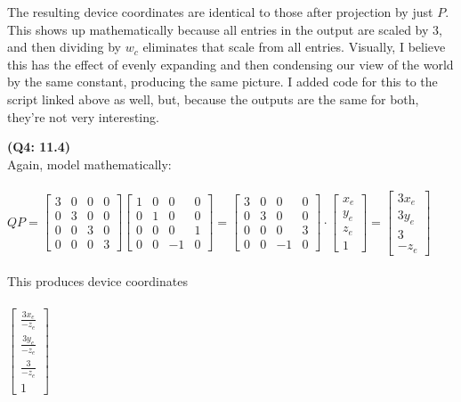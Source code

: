 \documentclass[letterpaper, 11pt]{article}
\begin{document}
The resulting device coordinates are identical to those after projection by just $P$. This shows up mathematically because all entries in the output are scaled by $3$, and then dividing by $w_c$ eliminates that scale from all entries. Visually, I believe this has the effect of evenly expanding and then condensing our view of the world by the same constant, producing the same picture. I added code for this to the script linked above as well, but, because the outputs are the same for both, they're not very interesting. 

\medskip
\textbf{(Q4: 11.4)} \\ 
Again, model mathematically: \\ \\ 
$QP = 
\begin{bmatrix}
3 & 0 & 0 & 0 \\
0 & 3 & 0 & 0 \\
0 & 0 & 3 & 0 \\
0 & 0 & 0 & 3
\end{bmatrix}
\begin{bmatrix}
1 & 0 & 0 & 0 \\
0 & 1 & 0 & 0 \\
0 & 0 & 0 & 1 \\
0 & 0 & -1 & 0
\end{bmatrix}
=
\begin{bmatrix}
3 & 0 & 0 & 0 \\
0 & 3 & 0 & 0 \\
0 & 0 & 0 & 3 \\
0 & 0 & -1 & 0
\end{bmatrix}
\cdot 
\begin{bmatrix}
x_e  \\
y_e  \\
z_e  \\
1 
\end{bmatrix}
=
\begin{bmatrix}
3x_e  \\
3y_e  \\
3  \\
-z_e 
\end{bmatrix}$ \\ \\

This produces device coordinates \\ \\ 
$\begin{bmatrix}
  \frac{3x_e}{-z_e} \\
  \frac{3y_e}{-z_e}  \\
  \frac{3}{-z_e}  \\
  1 
\end{bmatrix}$ \\ \\ 
\end{document}
